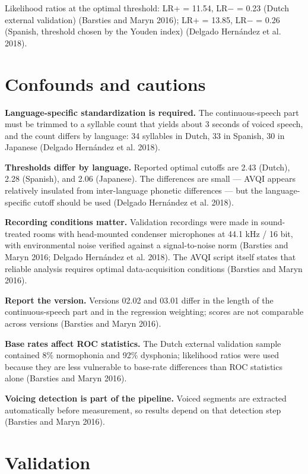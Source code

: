 \documentclass[
  english,
  letterpaper,
]{scrbook}
\begin{document}
Likelihood ratios at the optimal threshold: LR+ = 11.54, LR− = 0.23
(Dutch external validation) (Barsties and Maryn 2016); LR+ = 13.85, LR−
= 0.26 (Spanish, threshold chosen by the Youden index) (Delgado
Hernández et al. 2018).

\section{Confounds and cautions}\label{confounds-and-cautions-1}

\textbf{Language-specific standardization is required.} The
continuous-speech part must be trimmed to a syllable count that yields
about 3 seconds of voiced speech, and the count differs by language: 34
syllables in Dutch, 33 in Spanish, 30 in Japanese (Delgado Hernández et
al. 2018).

\textbf{Thresholds differ by language.} Reported optimal cutoffs are
2.43 (Dutch), 2.28 (Spanish), and 2.06 (Japanese). The differences are
small --- AVQI appears relatively insulated from inter-language phonetic
differences --- but the language-specific cutoff should be used (Delgado
Hernández et al. 2018).

\textbf{Recording conditions matter.} Validation recordings were made in
sound- treated rooms with head-mounted condenser microphones at 44.1 kHz
/ 16 bit, with environmental noise verified against a signal-to-noise
norm (Barsties and Maryn 2016; Delgado Hernández et al. 2018). The AVQI
script itself states that reliable analysis requires optimal
data-acquisition conditions (Barsties and Maryn 2016).

\textbf{Report the version.} Versions 02.02 and 03.01 differ in the
length of the continuous-speech part and in the regression weighting;
scores are not comparable across versions (Barsties and Maryn 2016).

\textbf{Base rates affect ROC statistics.} The Dutch external validation
sample contained 8\% normophonia and 92\% dysphonia; likelihood ratios
were used because they are less vulnerable to base-rate differences than
ROC statistics alone (Barsties and Maryn 2016).

\textbf{Voicing detection is part of the pipeline.} Voiced segments are
extracted automatically before measurement, so results depend on that
detection step (Barsties and Maryn 2016).

\section{Validation}\label{validation-1}
\end{document}
